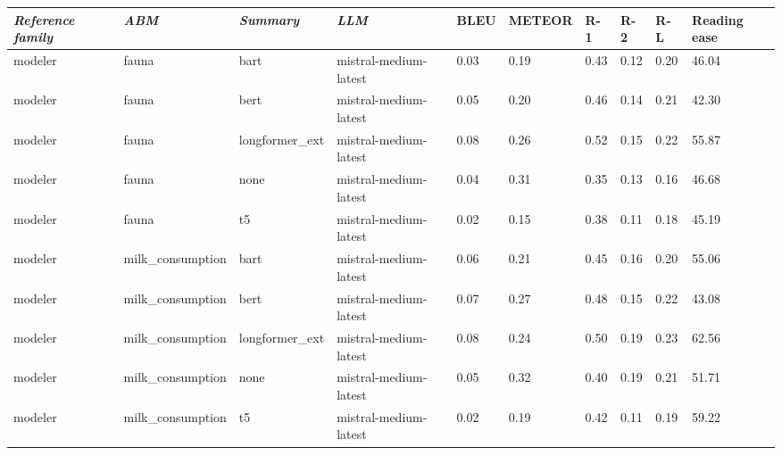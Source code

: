 \begin{tabular}{|l|l|l|l|l|l|l|l|l|l|}
\hline
\textit{\textbf{Reference family}} & \textit{\textbf{ABM}} & \textit{\textbf{Summary}} & \textit{\textbf{LLM}} & BLEU & METEOR & R-1 & R-2 & R-L & Reading ease \\
 \hline
 modeler & fauna & bart & mistral-medium-latest & 0.03 & 0.19 & 0.43 & 0.12 & 0.20 & 46.04 \\
 \hline
 modeler & fauna & bert & mistral-medium-latest & 0.05 & 0.20 & 0.46 & 0.14 & 0.21 & 42.30 \\
 \hline
 modeler & fauna & longformer\_ext & mistral-medium-latest & 0.08 & 0.26 & 0.52 & 0.15 & 0.22 & 55.87 \\
 \hline
 modeler & fauna & none & mistral-medium-latest & 0.04 & 0.31 & 0.35 & 0.13 & 0.16 & 46.68 \\
 \hline
 modeler & fauna & t5 & mistral-medium-latest & 0.02 & 0.15 & 0.38 & 0.11 & 0.18 & 45.19 \\
 \hline
 modeler & milk\_consumption & bart & mistral-medium-latest & 0.06 & 0.21 & 0.45 & 0.16 & 0.20 & 55.06 \\
 \hline
 modeler & milk\_consumption & bert & mistral-medium-latest & 0.07 & 0.27 & 0.48 & 0.15 & 0.22 & 43.08 \\
 \hline
 modeler & milk\_consumption & longformer\_ext & mistral-medium-latest & 0.08 & 0.24 & 0.50 & 0.19 & 0.23 & 62.56 \\
 \hline
 modeler & milk\_consumption & none & mistral-medium-latest & 0.05 & 0.32 & 0.40 & 0.19 & 0.21 & 51.71 \\
 \hline
 modeler & milk\_consumption & t5 & mistral-medium-latest & 0.02 & 0.19 & 0.42 & 0.11 & 0.19 & 59.22 \\
\hline
\end{tabular}
